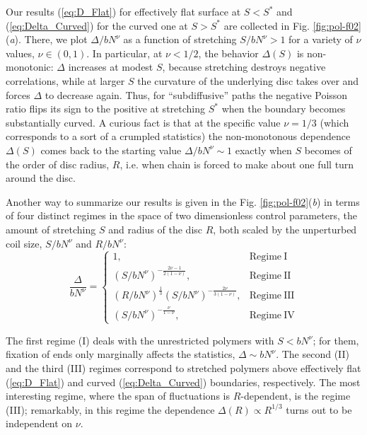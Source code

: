 \documentclass[aps,pre,floatfix,twocolumn,nofootinbib]{revtex4-2}
\newcommand{\be}{\begin{equation}}
\newcommand{\ee}{\end{equation}}
\newcommand{\eq}[1]{(\ref{#1})}
\begin{document}
Our results (\ref{eq:D_Flat}) for effectively flat surface at $S < S^{\ast}$ and (\ref{eq:Delta_Curved}) for the curved one at $S > S^{\ast}$ are collected in Fig. \ref{fig:pol-f02}(\textit{a}).  There, we plot $\Delta /bN^{\nu}$ as a function of stretching $S/bN^{\nu} > 1$ for a variety of $\nu$ values, $\nu\in (0,1)$.  In particular, at $\nu < 1/2$, the behavior $\Delta(S)$ is non-monotonic: $\Delta$ increases at modest $S$, because stretching destroys negative correlations, while at larger $S$ the curvature of the underlying disc takes over and forces $\Delta$ to decrease again. Thus, for ``subdiffusive'' paths the negative Poisson ratio flips its sign to the positive at stretching $S^*$ when the boundary becomes substantially curved. A curious fact is that at the specific value  $\nu = 1/3$ (which corresponds to a sort of a crumpled statistics) the non-monotonous dependence $\Delta(S)$ comes back to the starting value $\Delta / b N^{\nu} \sim 1$ exactly when $S$ becomes of the order of disc radius, $R$, i.e. when chain is forced to make about one full turn around the disc.



Another way to summarize our results is given in the  Fig. \ref{fig:pol-f02}(\textit{b}) in terms of four distinct regimes in the space of two dimensionless control parameters, the amount of stretching $S$ and radius of the disc $R$, both scaled by the unperturbed coil size, $S/bN^{\nu}$ and $R/bN^{\nu}$:
\be
\frac{\Delta}{b N^{\nu}} = \left\{\begin{array}{ll}  1 , & \mathrm{Regime \ I} \\\left( S / b N^{\nu} \right)^{-\frac{2 \nu - 1}{2 (1-\nu)}}, & \mathrm{Regime \ II}  \\   \left(R / b N^{\nu} \right)^{\frac{1}{3}} \left( S / b N^{\nu} \right)^{-\frac{2 \nu}{3 (1-\nu)}} , & \mathrm{Regime \ III} \\ \left( S / b N^{\nu} \right)^{-\frac{\nu}{1-\nu} }, & \mathrm{Regime \ IV}  \end{array} \right.
\label{eq:sumDelta}
\ee


The first regime (I) deals with the unrestricted polymers with $S< b N^{\nu}$; for them, fixation of ends only marginally affects the statistics, $\Delta \sim b N^{\nu}$. The second (II) and the third (III) regimes correspond to stretched polymers above effectively flat \eq{eq:D_Flat} and curved \eq{eq:Delta_Curved} boundaries, respectively. The most interesting regime, where the span of fluctuations is $R$-dependent, is the regime (III); remarkably, in this regime the dependence $\Delta(R) \propto R^{1/3}$ turns out to be independent on $\nu$.
\end{document}
